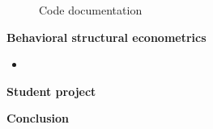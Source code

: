 \begin{frame}
\begin{figure}[htp]\centering
\caption{Code documentation}
\end{figure}
\end{frame}
\begin{frame}\textbf{Behavioral structural econometrics}\vspace{0.5cm}

\begin{itemize}\setlength\itemsep{1em}
\item {}
\end{itemize}

\end{frame}
\begin{frame}\begin{center}
\LARGE\textbf{Student project}
\end{center}\end{frame}
\begin{frame}\begin{center}
\LARGE\textbf{Conclusion}
\end{center}\end{frame}
